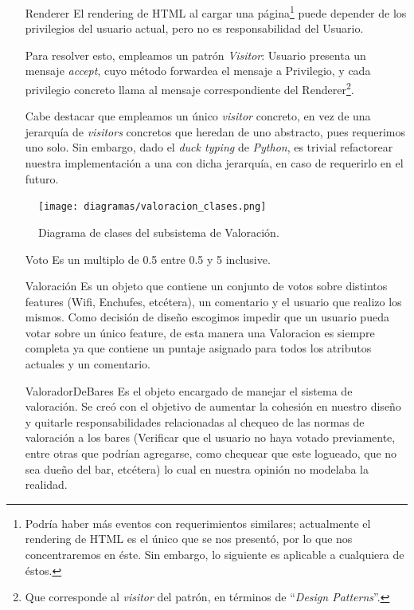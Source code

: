 \begin{itemize}
    \item[Renderer] El rendering de HTML al cargar una página\footnote{Podría haber más eventos con requerimientos similares; actualmente el rendering de HTML es el único que se nos presentó, por lo que nos concentraremos en éste. Sin embargo, lo siguiente es aplicable a cualquiera de éstos.} puede depender de los privilegios del usuario actual, pero no es responsabilidad del Usuario.
        \par Para resolver esto, empleamos un patrón \textit{Visitor}: Usuario presenta un mensaje \textit{accept}, cuyo método forwardea el mensaje a Privilegio, y cada privilegio concreto llama al mensaje correspondiente del Renderer\footnote{Que corresponde al \textit{visitor} del patrón, en términos de ``\textit{Design Patterns}''.}.
    \par Cabe destacar que empleamos un único \textit{visitor} concreto, en vez de una jerarquía de \textit{visitors} concretos que heredan de uno abstracto, pues requerimos uno solo. Sin embargo, dado el \textit{duck typing} de \textit{Python}, es trivial refactorear nuestra implementación a una con dicha jerarquía, en caso de requerirlo en el futuro.

\end{itemize}

\begin{figure}[H]
  \centering
  \texttt{[image: diagramas/valoracion\_clases.png]}
  \caption{\normalfont Diagrama de clases del subsistema de Valoración.}
\end{figure} 

\begin{itemize}

\item[Voto] Es un multiplo de 0.5 entre 0.5 y 5 inclusive.

\item[Valoración] Es un objeto que contiene un conjunto de votos sobre distintos features (Wifi,
Enchufes, etcétera), un comentario y el usuario que realizo los mismos. Como decisión de diseño escogimos impedir que un usuario pueda votar sobre un único feature, de esta manera una Valoracion es siempre completa ya que contiene un puntaje asignado para todos los atributos actuales y un comentario.

\item[ValoradorDeBares] Es el objeto encargado de manejar el sistema de valoración. Se creó con el objetivo de aumentar la cohesión en nuestro diseño y quitarle responsabilidades relacionadas al chequeo de las normas de valoración a los bares (Verificar que el usuario no haya votado previamente, entre otras que podrían agregarse, como chequear que este logueado, que no sea dueño del bar, etcétera) lo cual en nuestra opinión no modelaba la realidad.

\end{itemize}


